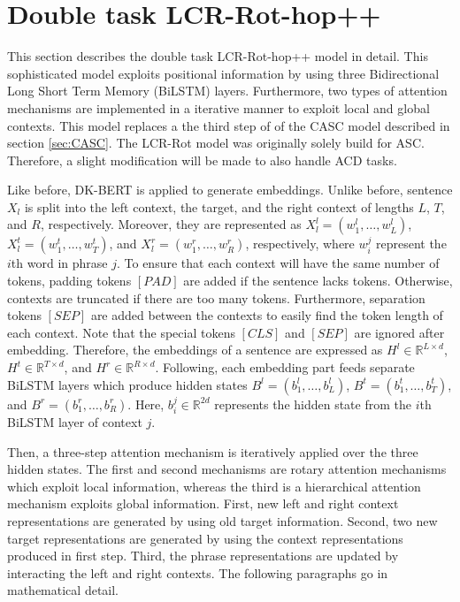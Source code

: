 \documentclass[american, oneside]{ecsgdp}
\begin{document}
\section{Double task LCR-Rot-hop++} \label{sec:LCR-Rot}
This section describes the double task LCR-Rot-hop++ model \parencite{Trusca2020HAABSA++} in detail. This sophisticated model exploits positional information by using three Bidirectional Long Short Term Memory (BiLSTM) layers. Furthermore, two types of attention mechanisms are implemented in a iterative manner to exploit local and global contexts. This model replaces a the third step of of the CASC model described in section \cref{sec:CASC}. The LCR-Rot model was originally solely build for ASC. Therefore, a slight modification will be made to also handle ACD tasks.

Like before, DK-BERT is applied to generate embeddings. Unlike before, sentence $X_l$ is split into the left context, the target, and the right context of lengths $L$, $T$, and $R$, respectively. Moreover, they are represented as $X_l^l = \left ( w_1^l, \ldots, w_L^l \right )$, $X_l^t = \left ( w_1^t, \ldots, w_T^t \right )$, and $X_l^r = \left ( w_1^r, \ldots, w_R^r \right )$, respectively, where $w_i^j$ represent the $i$th word in phrase $j$. To ensure that each context will have the same number of tokens, padding tokens $[PAD]$ are added if the sentence lacks tokens. Otherwise, contexts are truncated if there are too many tokens. Furthermore, separation tokens $[SEP]$ are added between the contexts to easily find the token length of each context. Note that the special tokens $[CLS]$ and $[SEP]$ are ignored after embedding. Therefore, the embeddings of a sentence are expressed as $H^l \in \mathbb{R}^{L \times d}$, $H^t \in \mathbb{R}^{T \times d}$, and $H^r \in \mathbb{R}^{R \times d}$. Following, each embedding part feeds separate BiLSTM layers which produce hidden states $B^l = \left( b_1^l, \dots, b_L^l \right)$, $B^t = \left( b_1^t, \dots, b_T^t \right)$, and $B^r = \left( b_1^r, \dots, b_R^r \right)$. Here, $b_i^j \in \mathbb{R}^{2d}$ represents the hidden state from the $i$th BiLSTM layer of context $j$.

Then, a three-step attention mechanism is iteratively applied over the three hidden states. The first and second mechanisms are rotary attention mechanisms which exploit local information, whereas the third is a hierarchical attention mechanism exploits global information. First, new left and right context representations are generated by using old target information. Second, two new target representations are generated by using the context representations produced in first step. Third, the phrase representations are updated by interacting the left and right contexts. The following paragraphs go in mathematical detail.
\end{document}
